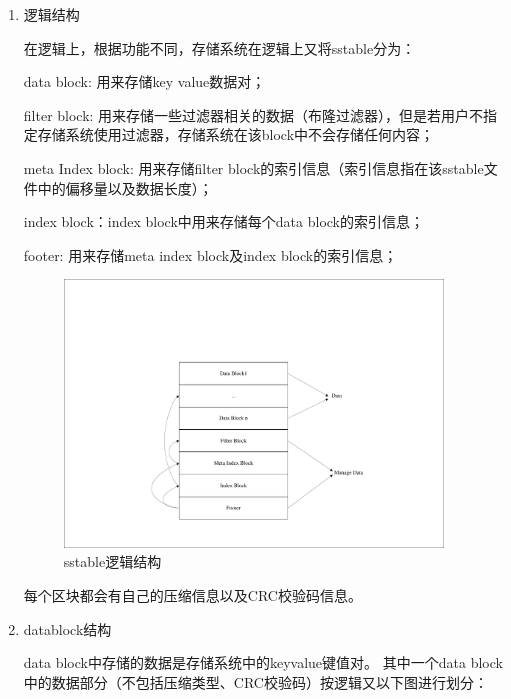 \begin{enumerate}
\begin{enumerate}
					\item 逻辑结构
	
					在逻辑上，根据功能不同，存储系统在逻辑上又将sstable分为：
	
	data block: 用来存储key value数据对；
	
	filter block: 用来存储一些过滤器相关的数据（布隆过滤器），但是若用户不指定存储系统使用过滤器，存储系统在该block中不会存储任何内容；
	
	meta Index block: 用来存储filter block的索引信息（索引信息指在该sstable文件中的偏移量以及数据长度）；
	
	index block：index block中用来存储每个data block的索引信息；
	
	footer: 用来存储meta index block及index block的索引信息；
	
	\begin{figure}[H]
		\centering
		\includegraphics[width=0.95\textwidth]{pdf/sstable_logic.pdf}
		\caption{sstable逻辑结构}
		\label{sstable_logic}
	\end{figure}
	
				每个区块都会有自己的压缩信息以及CRC校验码信息。
	
					\item datablock结构
	
					data block中存储的数据是存储系统中的keyvalue键值对。
					其中一个data block中的数据部分（不包括压缩类型、CRC校验码）按逻辑又以下图进行划分：
					

\end{enumerate}
\end{enumerate}
